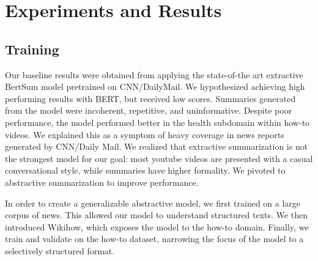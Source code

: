 \documentclass{article}
\begin{document}
\section{Experiments and Results}

\subsection{Training}
Our baseline results were obtained from applying the state-of-the art extractive BertSum model pretrained on CNN/DailyMail. We hypothesized achieving high performing results with BERT, but received low scores. Summaries generated from the model were incoherent, repetitive, and uninformative. Despite poor performance, the model performed better in the health subdomain within how-to videos. We explained this as a symptom of heavy coverage in news reports generated by CNN/Daily Mail. We realized that extractive summarization is not the strongest model for our goal: most youtube videos are presented with a casual conversational style, while summaries have higher formality. We pivoted to abstractive summarization to improve performance. 

In order to create a generalizable abstractive model, we first trained on a large corpus of news. This allowed our model to understand structured texts. We then introduced Wikihow, which exposes the model to the how-to domain. Finally, we train and validate on the how-to dataset, narrowing the focus of the model to a selectively structured format. 
\end{document}
